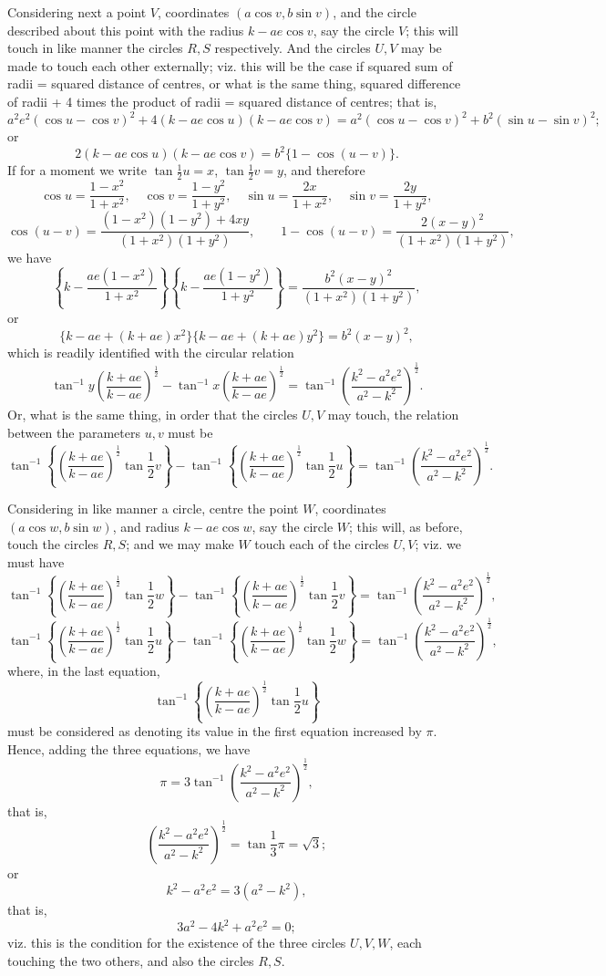 \documentclass[10pt]{article}
\begin{document}
Considering next a point $V$, coordinates $(a\cos v,b\sin v)$, and the circle
described about this point with the radius $k-ae\cos v$, say the circle $V$;
this will touch in like manner the circles $R,S$ respectively. And the circles
$U,V$ may be made to touch each other externally; viz. this will be the case if
squared sum of radii = squared distance of centres, or what is the same thing,
squared difference of radii + 4 times the product of radii = squared distance
of centres; that is,
\[
a^2e^2(\cos u-\cos v)^2
+4(k-ae\cos u)(k-ae\cos v)
=a^2(\cos u-\cos v)^2+b^2(\sin u-\sin v)^2;
\]
or
\[
        2(k-ae\cos u)(k-ae\cos v)=b^2\{1-\cos(u-v)\}.
\]
If for a moment we write $\tan \frac12 u=x$, $\tan \frac12 v=y$, and therefore
\[
\cos u=\frac{1-x^2}{1+x^2},\quad
\cos v=\frac{1-y^2}{1+y^2},\quad
\sin u=\frac{2x}{1+x^2},\quad
\sin v=\frac{2y}{1+y^2},
\]
\[
\cos(u-v)=
\frac{(1-x^2)(1-y^2)+4xy}{(1+x^2)(1+y^2)},\qquad
1-\cos(u-v)=\frac{2(x-y)^2}{(1+x^2)(1+y^2)},
\]
we have
\[
\left\{k-\frac{ae(1-x^2)}{1+x^2}\right\}
\left\{k-\frac{ae(1-y^2)}{1+y^2}\right\}
=\frac{b^2(x-y)^2}{(1+x^2)(1+y^2)},
\]
or
\[
\{k-ae+(k+ae)x^2\}\{k-ae+(k+ae)y^2\}=b^2(x-y)^2,
\]
which is readily identified with the circular relation
\[
\tan^{-1}y\left(\frac{k+ae}{k-ae}\right)^{\frac12}
-\tan^{-1}x\left(\frac{k+ae}{k-ae}\right)^{\frac12}
=
\tan^{-1}\left(\frac{k^2-a^2e^2}{a^2-k^2}\right)^{\frac12}.
\]
Or, what is the same thing, in order that the circles $U,V$ may touch, the
relation between the parameters $u,v$ must be
\[
\tan^{-1}\!\left\{\left(\frac{k+ae}{k-ae}\right)^{\frac12}\tan \frac12 v\right\}
-
\tan^{-1}\!\left\{\left(\frac{k+ae}{k-ae}\right)^{\frac12}\tan \frac12 u\right\}
=
\tan^{-1}\left(\frac{k^2-a^2e^2}{a^2-k^2}\right)^{\frac12}.
\]

Considering in like manner a circle, centre the point $W$, coordinates
$(a\cos w,b\sin w)$, and radius $k-ae\cos w$, say the circle $W$; this will, as
before, touch the circles $R,S$; and we may make $W$ touch each of the circles
$U,V$; viz. we must have
\[
\tan^{-1}\!\left\{\left(\frac{k+ae}{k-ae}\right)^{\frac12}\tan \frac12 w\right\}
-
\tan^{-1}\!\left\{\left(\frac{k+ae}{k-ae}\right)^{\frac12}\tan \frac12 v\right\}
=
\tan^{-1}\left(\frac{k^2-a^2e^2}{a^2-k^2}\right)^{\frac12},
\]
\[
\tan^{-1}\!\left\{\left(\frac{k+ae}{k-ae}\right)^{\frac12}\tan \frac12 u\right\}
-
\tan^{-1}\!\left\{\left(\frac{k+ae}{k-ae}\right)^{\frac12}\tan \frac12 w\right\}
=
\tan^{-1}\left(\frac{k^2-a^2e^2}{a^2-k^2}\right)^{\frac12},
\]
where, in the last equation,
\[
\tan^{-1}\!\left\{\left(\frac{k+ae}{k-ae}\right)^{\frac12}\tan \frac12 u\right\}
\]
must be considered as denoting its value in the first equation increased by
$\pi$. Hence, adding the three equations, we have
\[
\pi=3\tan^{-1}\left(\frac{k^2-a^2e^2}{a^2-k^2}\right)^{\frac12},
\]
that is,
\[
\left(\frac{k^2-a^2e^2}{a^2-k^2}\right)^{\frac12}
=\tan \frac13\pi=\sqrt{3};
\]
or
\[
k^2-a^2e^2=3(a^2-k^2),
\]
that is,
\[
3a^2-4k^2+a^2e^2=0;
\]
viz. this is the condition for the existence of the three circles $U,V,W$, each
touching the two others, and also the circles $R,S$.
\end{document}
